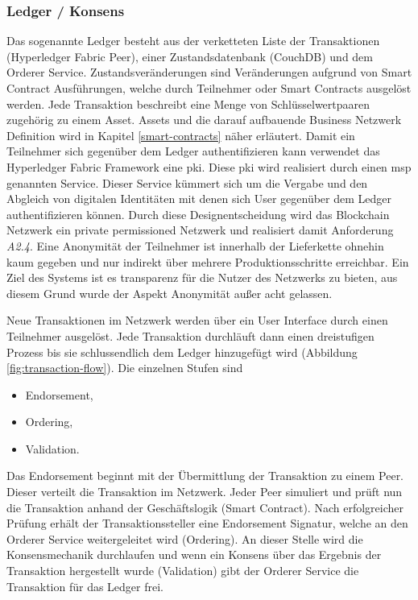 \subsubsection{Ledger / Konsens}
Das sogenannte Ledger besteht aus der verketteten Liste der Transaktionen (Hyperledger Fabric Peer), einer Zustandsdatenbank (CouchDB) und dem Orderer Service. Zustandsveränderungen sind Veränderungen aufgrund von Smart Contract Ausführungen, welche durch Teilnehmer oder Smart Contracts ausgelöst werden. Jede Transaktion beschreibt eine Menge von Schlüsselwertpaaren zugehörig zu einem Asset. Assets und die darauf aufbauende Business Netzwerk Definition wird in Kapitel \ref{smart-contracts} näher erläutert. Damit ein Teilnehmer sich gegenüber dem Ledger authentifizieren kann verwendet das Hyperledger Fabric Framework eine \acf{pki}. Diese \ac{pki} wird realisiert durch einen \ac{msp} genannten Service. Dieser Service kümmert sich um die Vergabe und den Abgleich von digitalen Identitäten mit denen sich User gegenüber dem Ledger authentifizieren können. Durch diese Designentscheidung wird das Blockchain Netzwerk ein private permissioned Netzwerk und realisiert damit Anforderung \textit{A2.4}. Eine Anonymität der Teilnehmer ist innerhalb der Lieferkette ohnehin kaum gegeben und nur indirekt über mehrere Produktionsschritte erreichbar. Ein Ziel des Systems ist es transparenz für die Nutzer des Netzwerks zu bieten, aus diesem Grund wurde der Aspekt Anonymität außer acht gelassen. 

Neue Transaktionen im Netzwerk werden über ein User Interface durch einen Teilnehmer ausgelöst. Jede Transaktion durchläuft dann einen dreistufigen Prozess bis sie schlussendlich dem Ledger hinzugefügt wird (Abbildung \ref{fig:transaction-flow}). Die einzelnen Stufen sind 

\begin{itemize}
	\item Endorsement,
	\item Ordering,
	\item Validation.
\end{itemize}

Das Endorsement beginnt mit der Übermittlung der Transaktion zu einem Peer. Dieser verteilt die Transaktion im Netzwerk. Jeder Peer simuliert und prüft nun die Transaktion anhand der Geschäftslogik (Smart Contract). Nach erfolgreicher Prüfung erhält der Transaktionssteller eine Endorsement Signatur, welche an den Orderer Service weitergeleitet wird (Ordering). An dieser Stelle wird die Konsensmechanik durchlaufen und wenn ein Konsens über das Ergebnis der Transaktion hergestellt wurde (Validation) gibt der Orderer Service die Transaktion für das Ledger frei.

